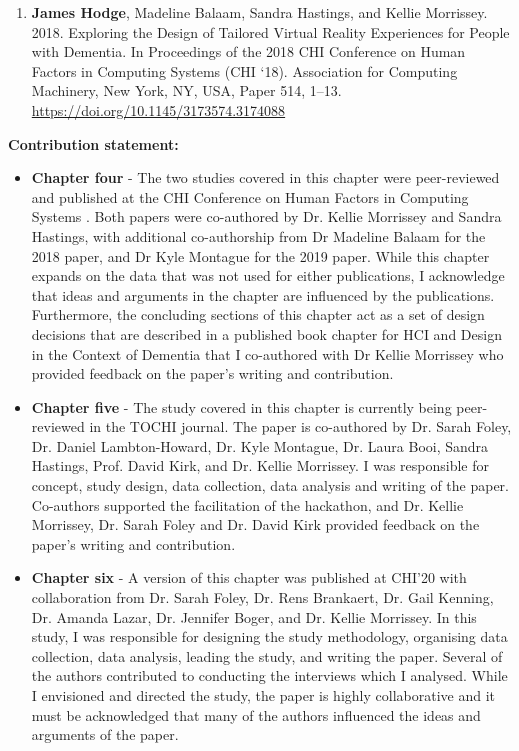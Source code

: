 \begin{enumerate}
    \item \textbf{James Hodge}, Madeline Balaam, Sandra Hastings, and Kellie Morrissey. 2018. Exploring the Design of Tailored Virtual Reality Experiences for People with Dementia. In Proceedings of the 2018 CHI Conference on Human Factors in Computing Systems (CHI `18). Association for Computing Machinery, New York, NY, USA, Paper 514, 1–13. \href{https://doi.org/10.1145/3173574.3174088}{https://doi.org/10.1145/3173574.3174088}

\end{enumerate}
\textbf{Contribution statement:} 
\begin{itemize}
    \item \textbf{Chapter four} - The two studies covered in this chapter were peer-reviewed and published at the CHI Conference on Human Factors in Computing Systems \citep{hodge_exploring_2018,hodge_exploring_2019}. Both papers were co-authored by Dr. Kellie Morrissey and Sandra Hastings, with additional co-authorship from Dr Madeline Balaam for the 2018 paper, and Dr Kyle Montague for the 2019 paper. While this chapter expands on the data that was not used for either publications, I acknowledge that ideas and arguments in the chapter are influenced by the publications. Furthermore, the concluding sections of this chapter act as a set of design decisions that are described in a published book chapter for HCI and Design in the Context of Dementia \citep{hodge2020sharing} that I co-authored with Dr Kellie Morrissey who provided feedback on the paper's writing and contribution. 

    \item \textbf{Chapter five} - The study covered in this chapter is currently being peer-reviewed in the TOCHI journal. The paper is co-authored by Dr. Sarah Foley, Dr. Daniel Lambton-Howard, Dr. Kyle Montague, Dr. Laura Booi, Sandra Hastings, Prof. David Kirk, and Dr. Kellie Morrissey. I was responsible for concept, study design, data collection, data analysis and writing of the paper. Co-authors supported the facilitation of the hackathon, and Dr. Kellie Morrissey, Dr. Sarah Foley and Dr. David Kirk provided feedback on the paper's writing and contribution.
    
    \item \textbf{Chapter six} - A version of this chapter was published at CHI'20 \citep{hodge_relational_2020} with collaboration from  Dr. Sarah Foley, Dr. Rens Brankaert, Dr. Gail Kenning, Dr. Amanda Lazar, Dr. Jennifer Boger, and Dr. Kellie Morrissey. In this study, I was responsible for designing the study methodology, organising data collection, data analysis, leading the study, and writing the paper. Several of the authors contributed to conducting the interviews which I analysed. While I envisioned and directed the study, the paper is highly collaborative and it must be acknowledged that many of the authors influenced the ideas and arguments of the paper.


\end{itemize}
